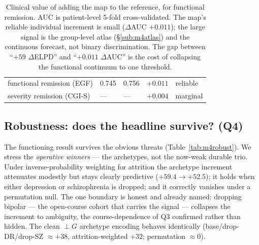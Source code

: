 \begin{table}[h]\centering\small\sffamily
\caption{Clinical value of adding the map to the reference, for functional remission. AUC is patient-level
5-fold cross-validated. The map's reliable individual increment is small ($\Delta$AUC $+0.011$); the large
signal is the group-level atlas (\S\ref{sub:m4atlas}) and the continuous forecast, not binary
discrimination. The gap between ``$+59$ $\Delta$ELPD'' and ``$+0.011$ $\Delta$AUC'' is the cost of
collapsing the functional continuum to one threshold.}
\label{tab:m4value}
\begin{tabular}{L{4.6cm} R{2.0cm} R{2.0cm} R{2.6cm} L{1.8cm}}
\toprule
{} &  &  &  & \\
\midrule
{} functional remission (EGF) & 0.745 & 0.756 & $+0.011$ & reliable\\
severity remission (CGI-S) & --- & --- & $+0.004$ & marginal\\
\bottomrule
\end{tabular}
\end{table}

\subsection{Robustness: does the headline survive? (Q4)}
The functioning result survives the obvious threats (Table~\ref{tab:m4robust}). We stress the
\emph{operative winners} --- the archetypes, not the now-weak durable trio. Under inverse-probability
weighting for attrition the archetype increment attenuates modestly but stays clearly predictive
($+59.4\to+52.5$); it holds when either depression or schizophrenia is dropped; and it correctly vanishes
under a permutation null. The one boundary is honest and already named: dropping bipolar --- the open-course
cohort that carries the signal --- collapses the increment to ambiguity, the course-dependence of Q3 confirmed
rather than hidden. The clean $\perp G$ archetype encoding behaves identically (base/drop-DR/drop-SZ
$\approx+38$, attrition-weighted $+32$; permutation $\approx0$).

